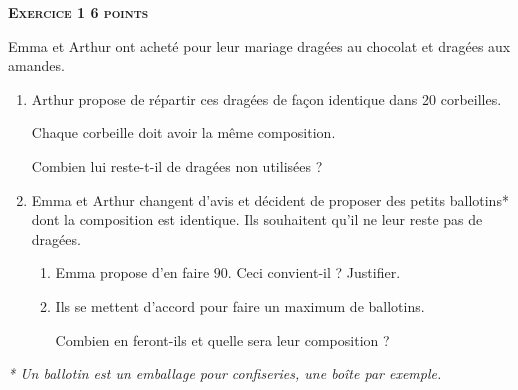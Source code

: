 \textbf{\textsc{Exercice 1 \hfill 6 points}}

\medskip
 
Emma et Arthur ont acheté pour leur mariage  dragées au chocolat et  dragées aux amandes.

\medskip
 
\begin{enumerate}
\item Arthur propose de répartir ces dragées de façon identique dans 20 corbeilles.
 
Chaque corbeille doit avoir la même composition.
 
Combien lui reste-t-il de dragées non utilisées ? 
\item Emma et Arthur changent d'avis et décident de proposer des petits ballotins* dont la composition est identique. Ils souhaitent qu'il ne leur reste pas de dragées. 
	\begin{enumerate}
		\item Emma propose d'en faire $90$. Ceci convient-il ? Justifier. 
		\item Ils se mettent d'accord pour faire un maximum de ballotins.
		
Combien en feront-ils et quelle sera leur composition ? 

 
	\end{enumerate}
\end{enumerate}

\emph{* Un ballotin est un emballage pour confiseries, une boîte par exemple.}

\vspace{0,5cm}

